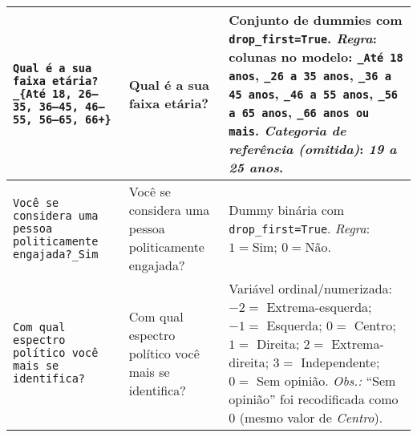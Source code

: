 \begin{apendicesenv}
\begin{longtable}{@{}%
  >{\raggedright\arraybackslash}p{4cm}%
  >{\raggedright\arraybackslash}p{4cm}%
  >{\raggedright\arraybackslash}p{7cm}@{}}
    \texttt{Qual é a sua faixa etária?{\_}\{Até 18, 26–35, 36–45, 46–55, 56–65, 66+\}} &
    Qual é a sua faixa etária? &
    Conjunto de dummies com \texttt{drop\_first=True}. \newline
    \emph{Regra}: colunas no modelo: \texttt{\_Até 18 anos}, \texttt{\_26 a 35 anos}, \texttt{\_36 a 45 anos}, \texttt{\_46 a 55 anos}, \texttt{\_56 a 65 anos}, \texttt{\_66 anos ou mais}. \newline
    \emph{Categoria de referência (omitida)}: \textit{19 a 25 anos}. \\ \hline

    \texttt{Você se considera uma pessoa politicamente engajada?{\_}Sim} &
    Você se considera uma pessoa politicamente engajada? &
    Dummy binária com \texttt{drop\_first=True}. \newline
    \emph{Regra}: $1=\text{Sim}$; $0=\text{Não}$. \\ \hline

    \texttt{Com qual espectro político você mais se identifica?} &
    Com qual espectro político você mais se identifica? &
    Variável ordinal/numerizada: \newline
    \quad $-2=$ Extrema-esquerda; $-1=$ Esquerda; $0=$ Centro; $1=$ Direita; $2=$ Extrema-direita; $3=$ Independente; $0=$ Sem opinião. \newline
    \emph{Obs.:} ``Sem opinião'' foi recodificada como $0$ (mesmo valor de \textit{Centro}). \\ \hline


\end{longtable}
\end{apendicesenv}
